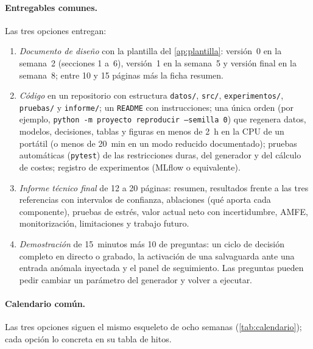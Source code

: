 \paragraph{Entregables comunes.} Las tres opciones entregan:
\begin{enumerate}[label=E\arabic*.]
  \item \emph{Documento de diseño} con la plantilla del \cref{ap:plantilla}: versión~0 en la semana~2 (secciones 1 a~6), versión~1 en la semana~5 y versión final en la semana~8; entre 10 y 15 páginas más la ficha resumen.
  \item \emph{Código} en un repositorio con estructura \texttt{datos/}, \texttt{src/}, \texttt{experimentos/}, \texttt{pruebas/} y \texttt{informe/}; un \texttt{README} con instrucciones; una única orden (por ejemplo, \texttt{python -m proyecto reproducir --semilla 0}) que regenera datos, modelos, decisiones, tablas y figuras en menos de 2~h en la CPU de un portátil (o menos de 20~min en un modo reducido documentado); pruebas automáticas (\texttt{pytest}) de las restricciones duras, del generador y del cálculo de costes; registro de experimentos (MLflow o equivalente).
  \item \emph{Informe técnico final} de 12 a 20 páginas: resumen, resultados frente a las tres referencias con intervalos de confianza, ablaciones (qué aporta cada componente), pruebas de estrés, valor actual neto con incertidumbre, AMFE, monitorización, limitaciones y trabajo futuro.
  \item \emph{Demostración} de 15~minutos más 10 de preguntas: un ciclo de decisión completo en directo o grabado, la activación de una salvaguarda ante una entrada anómala inyectada y el panel de seguimiento. Las preguntas pueden pedir cambiar un parámetro del generador y volver a ejecutar.
\end{enumerate}

\paragraph{Calendario común.} Las tres opciones siguen el mismo esqueleto de ocho semanas (\cref{tab:calendario}); cada opción lo concreta en su tabla de hitos.

